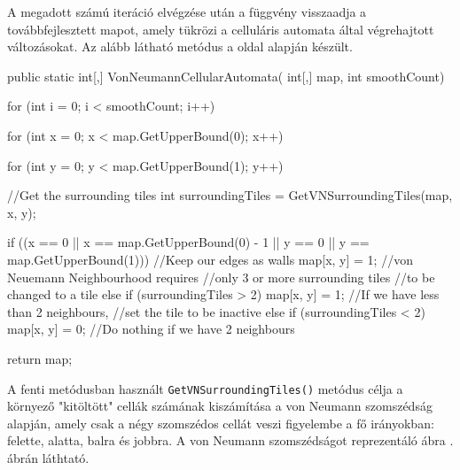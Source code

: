A megadott számú iteráció elvégzése után a függvény visszaadja a továbbfejlesztett mapot, amely tükrözi a celluláris automata által végrehajtott változásokat. Az alább látható metódus a \cite{mapgenerator} oldal alapján készült.

\begin{java}
public static int[,] VonNeumannCellularAutomata(
    int[,] map, int smoothCount)
{
    for (int i = 0; i < smoothCount; i++)
    {
        for (int x = 0; x < 
            map.GetUpperBound(0); x++)
        {
            for (int y = 0; y < 
                map.GetUpperBound(1); y++)
            {
                //Get the surrounding tiles
                int surroundingTiles = 
                    GetVNSurroundingTiles(map, x, y);

                if ((x == 0 || 
                    x == map.GetUpperBound(0) - 1 || 
                    y == 0 || y == map.GetUpperBound(1)))
                {
                    //Keep our edges as walls
                    map[x, y] = 1; 
                }
                //von Neuemann Neighbourhood requires
                //only 3 or more surrounding tiles
                //to be changed to a tile
                else if (surroundingTiles > 2)
                {
                    map[x, y] = 1;
                }
                //If we have less than 2 neighbours,
                //set the tile to be inactive
                else if (surroundingTiles < 2)
                {
                    map[x, y] = 0;
                }
                //Do nothing if we have 2 neighbours
            }
        }
    }
    return map;
}
\end{java}

A fenti metódusban használt \texttt{GetVNSurroundingTiles()} metódus \cite{mapgenerator} célja a környező "kitöltött" cellák számának kiszámítása a von Neumann szomszédság alapján, amely csak a négy szomszédos cellát veszi figyelembe a fő irányokban: felette, alatta, balra és jobbra. A von Neumann szomszédságot reprezentáló ábra . ábrán láthtató.

